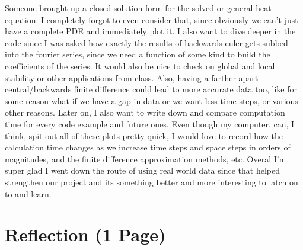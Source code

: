 \documentclass[11pt]{article}
\begin{document}
\begin{onehalfspace}
Someone brought up a closed solution form for the solved or general heat equation. 
I completely forgot to even consider that, since obviously we can't just have a complete PDE and immediately plot it.
I also want to dive deeper in the code since I was asked how exactly the results of backwards euler gets subbed into
the fourier series, since we need a function of some kind to build the coefficients of the series.
It would also be nice to check on global and local stability or other applications from class.
Also, having a farther apart central/backwards finite difference could lead to more accurate data too, 
like for some reason what if we have a gap in data or we want less time steps, or various other reasons.
Later on, I also want to write down and compare computation time for every code example and future ones.
Even though my computer, can, I think, spit out all of these plots pretty quick, I would love to record
how the calculation time changes as we increase time steps and space steps in orders of magnitudes, and the
finite difference approximation methods, etc. Overal I'm super glad I went down the route of using real world data
since that helped strengthen our project and its something better and more interesting to latch on to and learn.

\newpage

\section*{Reflection (1 Page)}


\end{onehalfspace}
\end{document}
